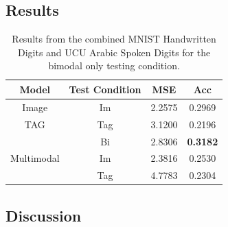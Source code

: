 \subsection{Results}
\begin{table}
	\centering
		\begin{tabular}{|c|c|c|c|}
		\hline
		Model	& Test Condition & MSE & Acc \\ \hline
		Image	& Im & 	2.2575	&	0.2969 \\ \hline		
		TAG		& Tag & 3.1200	&	0.2196 \\ \hline		
\multirow{3}{*}{Multimodal} & Bi & 2.8306	&	\textbf{0.3182} \\ \cline{2-4}
				& Im & 2.3816	&	0.2530\\ \cline{2-4}	
		
				& Tag & 4.7783	&	0.2304 \\ \hline		
						
		\end{tabular}
		\caption{Results from the combined MNIST Handwritten Digits and UCU Arabic Spoken Digits for the bimodal only testing condition.}
		\label{tab:flikr_res}

\end{table}


%

\subsection{Discussion}

